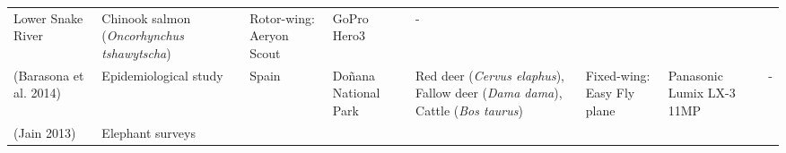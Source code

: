 \documentclass[]{interact}
\theoremstyle{plain}%
\theoremstyle{definition}
\theoremstyle{remark}
\begin{document}
\begin{longtable}[]{@{}llllllll@{}}
\begin{minipage}[t]{0.14\columnwidth}
Lower Snake River\strut
\end{minipage} & \begin{minipage}[t]{0.10\columnwidth}\raggedright\strut
Chinook salmon (\emph{Oncorhynchus tshawytscha})\strut
\end{minipage} & \begin{minipage}[t]{0.09\columnwidth}\raggedright\strut
Rotor-wing: Aeryon Scout\strut
\end{minipage} & \begin{minipage}[t]{0.11\columnwidth}\raggedright\strut
GoPro Hero3\strut
\end{minipage} & \begin{minipage}[t]{0.01\columnwidth}\raggedright\strut
-\strut
\end{minipage}\tabularnewline
\begin{minipage}[t]{0.11\columnwidth}\raggedright\strut
(Barasona et al. 2014)\strut
\end{minipage} & \begin{minipage}[t]{0.18\columnwidth}\raggedright\strut
Epidemiological study\strut
\end{minipage} & \begin{minipage}[t]{0.03\columnwidth}\raggedright\strut
Spain\strut
\end{minipage} & \begin{minipage}[t]{0.14\columnwidth}\raggedright\strut
Doñana National Park\strut
\end{minipage} & \begin{minipage}[t]{0.10\columnwidth}\raggedright\strut
Red deer (\emph{Cervus elaphus}), Fallow deer (\emph{Dama dama}), Cattle
(\emph{Bos taurus})\strut
\end{minipage} & \begin{minipage}[t]{0.09\columnwidth}\raggedright\strut
Fixed-wing: Easy Fly plane\strut
\end{minipage} & \begin{minipage}[t]{0.11\columnwidth}\raggedright\strut
Panasonic Lumix LX-3 11MP\strut
\end{minipage} & \begin{minipage}[t]{0.01\columnwidth}\raggedright\strut
-\strut
\end{minipage}\tabularnewline
\begin{minipage}[t]{0.11\columnwidth}\raggedright\strut
(Jain 2013)\strut
\end{minipage} & \begin{minipage}[t]{0.18\columnwidth}\raggedright\strut
Elephant surveys\strut

\end{minipage}
\end{longtable}
\end{document}
